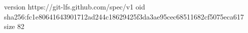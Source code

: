 version https://git-lfs.github.com/spec/v1
oid sha256:fc1e80641643901712ad244c18629425f3da3ae95cec68511682cf5075eca617
size 82
